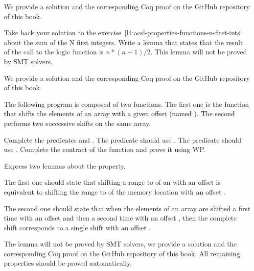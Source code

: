 We provide a solution and the corresponding Coq proof on the GitHub repository
of this book.


\label{l4:acsl-properties-lemmas-n-first-ints}

Take back your solution to the
exercise~\ref{l4:acsl-properties-functions-n-first-ints} about the sum of the
N first integers. Write a lemma that states that the result of the call to the
logic function is $n*(n+1)/2$. This lemma will not be proved by SMT solvers.


We provide a solution and the corresponding Coq proof on the GitHub repository
of this book.


\label{l4:acsl-properties-lemmas-shift-trans}


The following program is composed of two functions. The first one is the
 function that shifts the elements of an array with a
given offset (named ). The second performs two successive
shifts on the same array.




Complete the predicates  and .
The  predicate should use .
The  predicate should use .
Complete the contract of the  function and prove
it using WP.


Express two lemmas about the  property.


The first one  should state that shifting a range
 to  of an  with an
offset  is equivalent to shifting the range  to
 of the memory location  with an offset
.



The second one should state that when the elements of an array are shifted a
first time with an offset  and then a second time with an offset
, then the complete shift corresponds to a single shift with an
offset .



The lemma  will not be proved by SMT solvers, we provide
a solution and the corresponding Coq proof on the GitHub repository of this
book. All remaining properties should be proved automatically.



